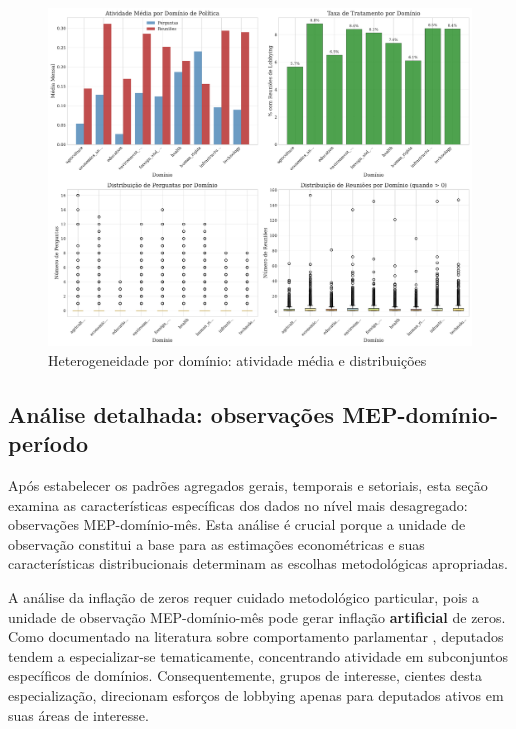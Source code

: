 \begin{figure}[htbp]
\centering
\includegraphics[width=.9\textwidth]{figures/fig3_domain_heterogeneity.pdf}
\caption{Heterogeneidade por domínio: atividade média e distribuições}
\label{fig:domain_heterogeneity}
\end{figure}

\subsection{Análise detalhada: observações MEP-domínio-período}

Após estabelecer os padrões agregados gerais, temporais e setoriais, esta seção examina as características específicas dos dados no nível mais desagregado: observações MEP-domínio-mês. Esta análise é crucial porque a unidade de observação constitui a base para as estimações econométricas e suas características distribucionais determinam as escolhas metodológicas apropriadas.


A análise da inflação de zeros requer cuidado metodológico particular, pois a unidade de observação MEP-domínio-mês pode gerar inflação \textbf{artificial} de zeros. Como documentado na literatura sobre comportamento parlamentar \cite{example}, deputados tendem a especializar-se tematicamente, concentrando atividade em subconjuntos específicos de domínios. Consequentemente, grupos de interesse, cientes desta especialização, direcionam esforços de lobbying apenas para deputados ativos em suas áreas de interesse.

